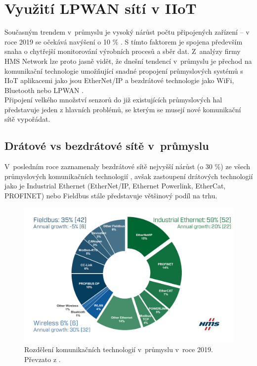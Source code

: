 \chapter{Využití LPWAN sítí v IIoT}
    Současným trendem v~průmyslu je vysoký nárůst počtu připojených zařízení – v~ roce 2019 se očekává navýšení o 10 \% \cite{website:1}. S tímto faktorem je spojena především snaha o chytřejší monitorování výrobních procesů a sběr dat. Z~analýzy firmy HMS Network lze proto jasně vidět, že dnešní tendencí v~průmyslu je přechod na komunikační technologie umožňující snadné propojení průmyslových systémů s IIoT aplikacemi jako jsou EtherNet/IP a bezdrátové technologie jako WiFi, Bluetooth nebo LPWAN \cite{website:1}.\\
    Připojení velkého množství senzorů do již existujících průmyslových hal představuje jeden z hlavních problémů, se kterým se musejí nové komunikační sítě vypořádat.
    
   
\section{Drátové vs bezdrátové sítě v~průmyslu}
\label{section:drat}
    V~posledním roce zaznamenaly bezdrátové sítě nejvyšší nárůst (o 30 \%)  ze všech průmyslových komunikačních technologií \cite{website:1}, avšak zastoupení drátových technologií jako je Industrial Ethernet (EtherNet/IP, Ethernet Powerlink, EtherCat, PROFINET) nebo Fieldbus stále představuje většinový podíl na trhu.
    
    \begin{figure} [!ht]
        \centering
        \caption{Rozdělení komunikačních technologií v~průmyslu v~roce 2019. Převzato z \cite{website:1}.}
        \includegraphics[width=\textwidth]{LPWAN/Figs/networkshares2019.png}
    \end{figure} 
    
